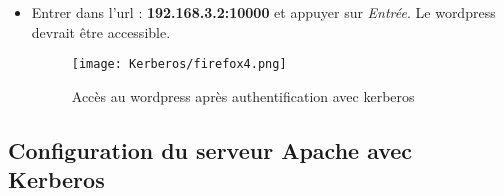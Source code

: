 \begin{itemize}
\pagebreak
  \item Entrer dans l'url : {\NoAutoSpacing \textbf{192.168.3.2:10000}} et appuyer sur \textit{Entrée}. Le wordpress devrait être accessible.
   \begin{figure}[h!]
     \begin{center}
         \texttt{[image: Kerberos/firefox4.png]}
         \caption{Accès au wordpress après authentification avec kerberos}
         \label{Debian_screenshots/Config/5}
     \end{center}
  \end{figure}
  \FloatBarrier
\end{itemize}

\subsection{Configuration du serveur Apache avec Kerberos}

